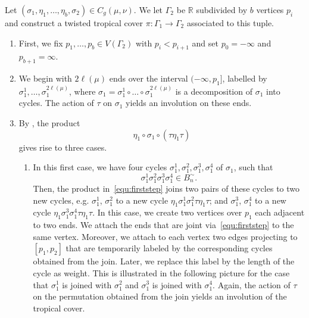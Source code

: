 \documentclass[ALCO,published]{cedram}
\begin{document}
\begin{construction}
\label{con-twist}
Let $(\sigma_1,
\eta_1,\dots,\eta_b,\sigma_2)\in C_g(\mu,\nu)$. We let $\Gamma_2$ be $\mathbb{R}$ subdivided by $b$ vertices $p_i$ and construct a twisted tropical cover $\pi\colon\Gamma_1\to\Gamma_2$ associated to this tuple.

\begin{enumerate}
    \item First, we fix $p_1,\dots,p_b\in V(\Gamma_2)$ with $p_i<p_{i+1}$ and set $p_0=-\infty$ and $p_{b+1}=
    \infty$.
    \item We begin with $2\ell(\mu)$ ends over the interval $(-\infty,p_1]$, labelled by $\sigma_1^1,\dots,\sigma_1^{2\ell(\mu)}$, where $\sigma_1=\sigma_1^1\circ \ldots \circ \sigma_1^{2\ell(\mu)}$ is a decomposition of $\sigma_1$ into cycles. The action of $\tau$ on $\sigma_1$ yields an involution on these ends.
    \item By \cite[Theorem 2.14]{BF21}, the product
    \begin{equation}
    \label{equ:firststep}
        \eta_1\circ\sigma_1\circ(\tau\eta_1\tau) \tag{*}
    \end{equation}
    gives rise to three cases.
    \begin{enumerate}
        \item In this first case, we have four cycles $\sigma_1^1,\sigma_1^2,\sigma_1^3,\sigma_1^4$ of $\sigma_1$, such that
        \begin{equation*}
            \sigma_1^1\sigma_1^2\sigma_1^3\sigma_1^4\in B^{\sim}_n.
        \end{equation*}
        Then, the product in~\eqref{equ:firststep} joins two pairs of these cycles to two new cycles, e.g. $\sigma_1^1$, $\sigma_1^2$ to a new cycle $\eta_1\sigma_1^1\sigma_1^2\tau\eta_1\tau$; and $\sigma_1^3$, $\sigma_1^4$ to a new cycle $\eta_1\sigma_1^3\sigma_1^4\tau\eta_1\tau$.
        In this case, we create two vertices over $p_1$ each adjacent to two ends. We attach the ends that are joint via~\eqref{equ:firststep} to the same vertex. Moreover, we attach to each vertex two edges projecting to $[p_1,p_2]$ that are temporarily labeled by the corresponding cycles obtained from the join. Later, we replace this label by the length of the cycle as weight. This is illustrated in the following picture for the case that $\sigma_1^1$ is joined with $\sigma_1^2$ and $\sigma_1^3$ is joined with $\sigma_1^4$. Again, the action of $\tau$ on the permutation obtained from the join yields an involution of the tropical cover. 
        

\end{enumerate}
\end{enumerate}
\end{construction}
\end{document}
